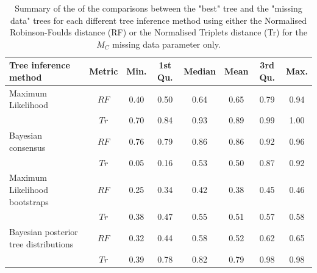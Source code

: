 \begin{landscape}
\begin{table}[ht]
\caption{Summary of the of the comparisons between the "best" tree and the "missing data" trees for each different tree inference method using either the Normalised Robinson-Foulds distance (RF) or the Normalised Triplets distance (Tr) for the $M_{C}$ missing data parameter only.}
\label{Tab_Supp_summary_metric_MC}
\centering
\begin{tabular}{lccccccc}
  \hline
 Tree inference method & Metric & Min. & 1st Qu. & Median & Mean & 3rd Qu. & Max. \\ 
  \hline
  Maximum Likelihood                    & $RF$ & 0.40 & 0.50 & 0.64 & 0.65 & 0.79 & 0.94 \\ 
                                        & $Tr$ & 0.70 & 0.84 & 0.93 & 0.89 & 0.99 & 1.00 \\ 
  Bayesian consensus                    & $RF$ & 0.76 & 0.79 & 0.86 & 0.86 & 0.92 & 0.96 \\ 
                                        & $Tr$ & 0.05 & 0.16 & 0.53 & 0.50 & 0.87 & 0.92 \\ 
  Maximum Likelihood bootstraps         & $RF$ & 0.25 & 0.34 & 0.42 & 0.38 & 0.45 & 0.46 \\ 
                                        & $Tr$ & 0.38 & 0.47 & 0.55 & 0.51 & 0.57 & 0.58 \\ 
  Bayesian posterior tree distributions & $RF$ & 0.32 & 0.44 & 0.58 & 0.52 & 0.62 & 0.65 \\ 
                                        & $Tr$ & 0.39 & 0.78 & 0.82 & 0.79 & 0.98 & 0.98 \\ 
   \hline
\end{tabular}
\end{table}
\end{landscape}


